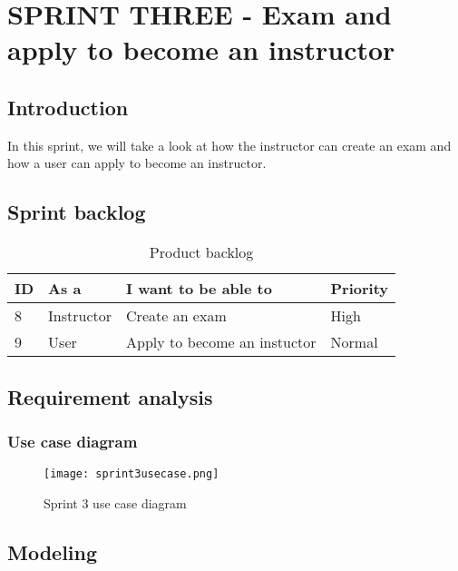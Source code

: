 \chapter{SPRINT THREE - Exam and apply to become an instructor}
\minitoc
\newpage
\section*{Introduction}
In this sprint, we will take a look at how the instructor can create an exam and how a user can apply to become an instructor.
\section{Sprint backlog}
\begin{table}[H]
\centering
\caption{Product backlog}
\begin{tabular}{|p{1cm}|p{3cm}|p{6cm}|p{2cm}|}
\hline
\rowcolor{brown!18}\textbf{\large{ID}} & \textbf{\large{As a}} & \textbf{\large{I want to be able to}} & \textbf{\large{Priority}} \\
\hline
8& Instructor & Create an exam & High\\\hline
9& User & Apply to become an instuctor  & Normal \\\hline
\end{tabular}
\end{table}
\section{Requirement analysis}
\subsection{Use case diagram}

\begin{figure}[!ht]
    \centering
    \texttt{[image: sprint3usecase.png]}
    \caption{Sprint 3 use case diagram}
    \label{fig:sprint3usecase}
\end{figure}



\section{Modeling}

